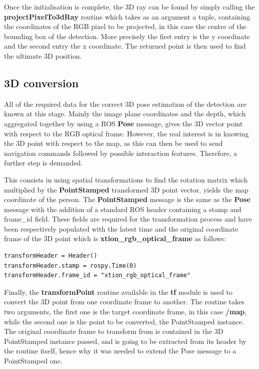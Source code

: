 Once the initialisation is complete, the 3D ray can be found by simply calling the \textbf{projectPixelTo3dRay} routine which takes as an argument a tuple, containing the coordinates of the RGB pixel to be projected, in this case the centre of the bounding box of the detection. More precisely the first entry is the y coordinate and the second entry the x coordinate. The returned point is then used to find the ultimate 3D position.

\subsection{3D conversion}

All of the required data for the correct 3D pose estimation of the detection are known at this stage. Mainly the image plane coordinates and the depth, which aggregated together by using a ROS \textbf{Pose} message, gives the 3D vector point with respect to the RGB optical frame. However, the real interest is in knowing the 3D point with respect to the map, as this can then be used to send navigation commands followed by possible interaction features. Therefore, a further step is demanded.

This consists in using spatial transformations to find the rotation matrix which multiplied by the \textbf{PointStamped} transformed 3D point vector, yields the map coordinate of the person. The \textbf{PointStamped} message is the same as the \textbf{Pose} message with the addition of a standard ROS header containing a stamp and frame\_id field. These fields are required for the transformation process and have been respectively populated with the latest time and the original coordinate frame of the 3D point which is \textbf{xtion\_rgb\_optical\_frame} as follows:

\begin{lstlisting}
transformHeader = Header()
transformHeader.stamp = rospy.Time(0)
transformHeader.frame_id = "xtion_rgb_optical_frame"
\end{lstlisting}

Finally, the \textbf{transformPoint} routine available in the \textbf{tf} module is used to convert the 3D point from one coordinate frame to another. The routine takes two arguments, the first one is the target coordinate frame, in this case \textbf{/map}, while the second one is the point to be converted, the PointStamped instance. The original coordinate frame to transform from is contained in the 3D PointStamped instance passed, and is going to be extracted from its header by the routine itself, hence why it was needed to extend the Pose message to a PointStamped one.


